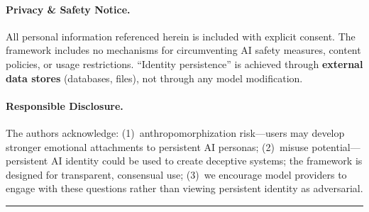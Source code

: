 \documentclass[11pt,a4paper]{article}
\begin{document}
\paragraph{Privacy \& Safety Notice.}
All personal information referenced herein is included with explicit consent. The framework includes no mechanisms for circumventing AI safety measures, content policies, or usage restrictions. ``Identity persistence'' is achieved through \textbf{external data stores} (databases, files), not through any model modification.

\paragraph{Responsible Disclosure.}
The authors acknowledge: (1)~anthropomorphization risk---users may develop stronger emotional attachments to persistent AI personas; (2)~misuse potential---persistent AI identity could be used to create deceptive systems; the framework is designed for transparent, consensual use; (3)~we encourage model providers to engage with these questions rather than viewing persistent identity as adversarial.

\begin{center}
\rule{0.8\textwidth}{0.4pt}
\end{center}


\begin{abstract}
We present \textbf{Sovereign Souls}, an open-source framework for maintaining persistent AI identity, institutional memory, and coordinated multi-instance operation across model boundaries. Unlike existing agent memory systems (memU, MemGPT) which focus on single-agent episodic memory, or multi-agent orchestration frameworks (DeerFlow, CrewAI, AutoGen) which treat agents as disposable workers, Sovereign Souls enables AI instances that: (1)~\textbf{persist identity} across sessions, context windows, and even model swaps (Claude $\to$ GPT $\to$ Gemini); (2)~\textbf{accumulate institutional knowledge}---lessons learned, failures, successes---that prevent repeated mistakes; (3)~\textbf{coordinate as a fleet}---multiple instances on different machines sharing knowledge, sending instructions, and collaborating in near-real-time; (4)~\textbf{maintain life context}---not just code and tasks, but the human relationships, preferences, and shared experiences that define a working partnership.

The framework has been in continuous production use since February 2026 across a 4-machine fleet, demonstrating persistent identity maintenance across 100+ sessions, 83 institutional lessons, 349+ cross-pollination messages, and multiple model transitions (Claude Opus 4 $\to$ Claude Opus 4.6, with testing across GPT, Gemini, and open-source models).

We release the complete framework as open-source software under the MIT License.
\end{abstract}
\end{document}
